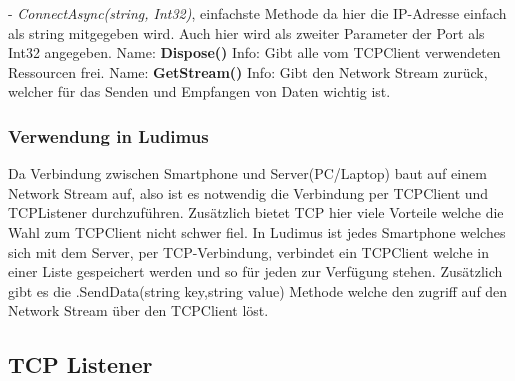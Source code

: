 \newline \tab \newline
- \textit{ConnectAsync(string, Int32)}, einfachste Methode da hier die IP-Adresse einfach als string mitgegeben wird. Auch hier wird als zweiter Parameter der Port als Int32 angegeben.
\newline \newline
Name: \textbf{Dispose()}
\newline
Info: Gibt alle vom TCPClient verwendeten Ressourcen frei.
\newline \newline
Name: \textbf{GetStream()}
\newline
Info: Gibt den Network Stream zurück, welcher für das Senden und Empfangen von Daten wichtig ist.
\newline
\subsubsection{Verwendung in Ludimus}
Da Verbindung zwischen Smartphone und Server(PC/Laptop) baut auf einem Network Stream auf, also ist es notwendig die Verbindung per TCPClient und TCPListener durchzuführen. Zusätzlich bietet TCP hier viele Vorteile welche die Wahl zum TCPClient nicht schwer fiel. In Ludimus ist jedes Smartphone welches sich mit dem Server, per TCP-Verbindung, verbindet ein TCPClient welche in einer Liste gespeichert werden und so für jeden zur Verfügung stehen. Zusätzlich gibt es die .SendData(string key,string value) Methode welche den zugriff auf den Network Stream über den TCPClient löst. 
\subsection{TCP Listener} \label{tcplistener}
